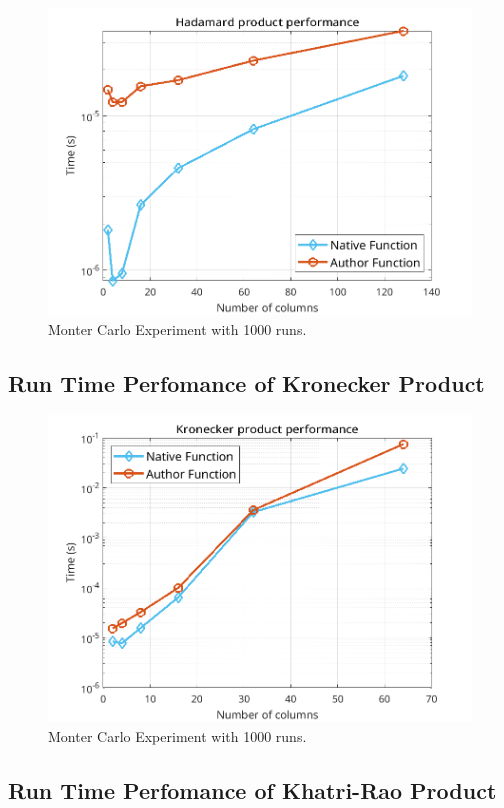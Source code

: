 \documentclass[a4paper,10pt]{article}
\begin{document}
    \begin{figure}[ht!]
        \centering 
        \includegraphics[width=0.65\linewidth]{figs/hw1a1.png} \par 
        \caption{Monter Carlo Experiment with 1000 runs.}
        \label{fig:hw1a1} 
    \end{figure}

    \subsection*{Run Time Perfomance of Kronecker Product}

    \begin{figure}[ht!]
        \centering 
        \includegraphics[width=0.65\linewidth]{figs/hw1a2.png} \par 
        \caption{Monter Carlo Experiment with 1000 runs.}
        \label{fig:hw1a2} 
    \end{figure}

    \subsection*{Run Time Perfomance of Khatri-Rao Product}
\end{document}
